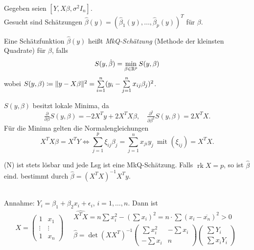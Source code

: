 \documentclass{cheat-sheet}
\DeclareMathOperator{\rk}{rk} %
\begin{document}


\begin{problem}
  Gegeben seien $[Y, X \beta, \sigma^2 I_n]$. \\
  Gesucht sind Schätzungen $\hat{\beta}(y) = (\hat{\beta}_1(y), \ldots, \hat{\beta}_p(y))^T$ für $\beta$.
\end{problem}

\begin{defn}
  Eine Schätzfunktion $\hat{\beta}(y)$ heißt \emph{MkQ-Schätzung} (Methode der kleinsten Quadrate) für $\beta$, falls
  \[ S(y, \hat{\beta}) = \min_{\beta \in \mathbb{R}^p} S(y, \beta) \]
  wobei $S(y, \beta) \coloneqq \norm{y - X \beta}^2 = \sum_{i=1}^n (y_i - \sum_{j=1}^n x_{ij} \beta_j)^2$.
\end{defn}

\begin{bem}
  $S(y, \beta)$ besitzt lokale Minima, da
  \[
    \tfrac{\partial}{\partial \beta} S(y, \beta) = - 2 X^T y + 2 X^T X \beta, \quad
    \tfrac{\partial^2}{\partial \beta^2} S(y, \beta) = 2 X^T X.
  \]
  Für die Minima gelten die Normalengleichungen
  \[
    X^T X \beta = X^T Y \iff \sum_{j=1}^p \xi_{ij} \beta_j = \sum_{j=1}^n x_{ji} y_j \enspace
    \text{mit } (\xi_{ij}) = X^T X.
    \tag{N}
  \]
\end{bem}

\begin{satz}
  (N) ist stets lösbar und jede Lsg ist eine MkQ-Schätzung.
  Falls $\rk X = p$, so ist $\hat{\beta}$ eind. bestimmt durch $\hat{\beta} = (X^T X)^{-1} X^T y$.
\end{satz}

\begin{bsp} \mbox{} \\
  Annahme: \enspace
  $Y_i = \beta_1 + \beta_2 x_i + \epsilon_i$, \enspace
  $i = 1, \ldots, n$.
  Dann ist
  \[
    X = \begin{pmatrix}
      1 & x_1 \\
      \vdots & \vdots \\
      1 & x_n
    \end{pmatrix} \quad
    \begin{array}{l}
      \hat{X^T X} = n \sum x_i^2 - \left( \sum x_i \right)^2 = n \cdot \sum (x_i - \overline{x_n})^2 > 0 \\[4pt]
      \hat{\beta} = \det(X X^T)^{-1} \begin{pmatrix}
        \sum x_i^2 & - \sum x_i \\
        - \sum x_i & n
      \end{pmatrix} \begin{pmatrix}
        \sum Y_i \\
        \sum x_i Y_i
      \end{pmatrix}
    \end{array}
  \]
\end{bsp}
\end{document}
